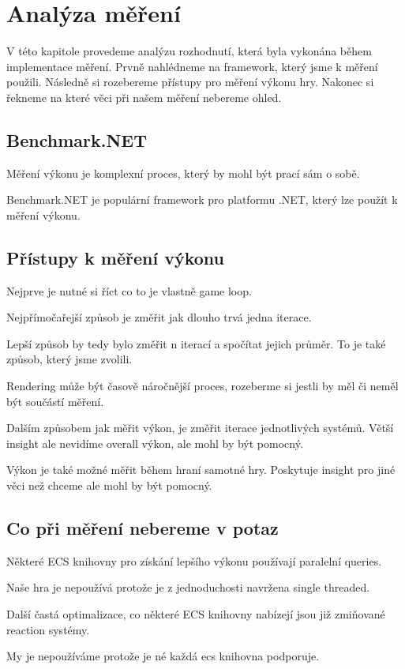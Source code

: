 \chapter{Analýza měření}
V této kapitole provedeme analýzu rozhodnutí, která byla vykonána během implementace měření. Prvně nahlédneme na framework, který jsme k měření použili. Následně si rozebereme přístupy pro měření výkonu hry. Nakonec si řekneme na které věci při našem měření nebereme ohled.

\section{Benchmark.NET}
Měření výkonu je komplexní proces, který by mohl být prací sám o sobě.

Benchmark.NET je populární framework pro platformu .NET, který lze použít k měření výkonu.

\section{Přístupy k měření výkonu}

Nejprve je nutné si říct co to je vlastně game loop.

Nejpřímočařejší způsob je změřit jak dlouho trvá jedna iterace.

Lepší způsob by tedy bylo změřit n iterací a spočítat jejich průměr. To je také způsob, který jsme zvolili.

Rendering může být časově náročnější proces, rozeberme si jestli by měl či neměl být součástí měření.

Dalším způsobem jak měřit výkon, je změřit iterace jednotlivých systémů. Větší insight ale nevidíme overall výkon, ale mohl by být pomocný.

Výkon je také možné měřit během hraní samotné hry. Poskytuje insight pro jiné věci než chceme ale mohl by být pomocný.

\section{Co při měření nebereme v potaz}
Některé ECS knihovny pro získání lepšího výkonu používají paralelní queries.

Naše hra je nepoužívá protože je z jednoduchosti navržena single threaded.

Další častá optimalizace, co některé ECS knihovny nabízejí jsou již zmiňované reaction systémy.

My je nepoužíváme protože je né každá ecs knihovna podporuje.

